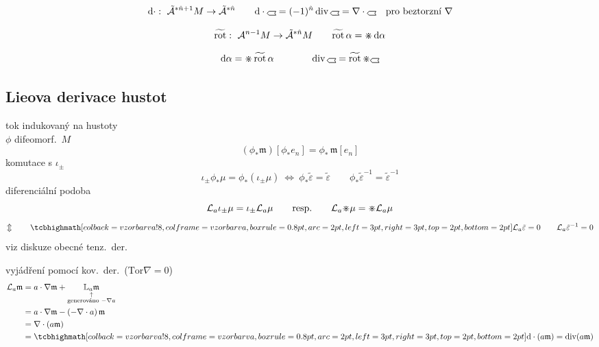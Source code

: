 \begin{definice}[]
\[
  \dd\cdot:\ \tilde{\mathcal{A}}^{*\hat n+1}M\to\tilde{\mathcal{A}}^{*\hat n} \qquad
  \dd\cdot\gmIhustsym = (-1)^{\hat n}\,\mathrm{div}\,\gmIhustsym = \nabla\cdot\gmIhustsym \quad\text{pro beztorzní } \nabla
\]
\end{definice}
\begin{definice}
\[
  \widetilde{\mathrm{rot}}:\ \mathcal{A}^{n-1}M\to\tilde{\mathcal{A}}^{*\hat n}M \qquad \widetilde{\mathrm{rot}}\,\alpha = \gmIhdual\,\dd\alpha
\]
\end{definice}
\begin{veta}[Lemma]
\[
  \dd\alpha = \gmIhdual\,\widetilde{\mathrm{rot}}\,\alpha \qquad\qquad \mathrm{div}\,\gmIhustsym = \widetilde{\mathrm{rot}}\,\gmIhdual\gmIhustsym
\]
\end{veta}

\subsection{Lieova derivace hustot}

tok indukovaný na hustoty \\
\quad $\phi$ difeomorf.\ $M$
\[
  (\phi_*\mathfrak{m})[\phi_*e_n] = \phi_*\,\mathfrak{m}[e_n]
\]
komutace s $\iota_\pm$
\[
  \iota_\pm\phi_*\mu = \phi_*(\iota_\pm\mu) \ \Longleftrightarrow\ \phi_*\tilde\varepsilon = \tilde\varepsilon \qquad \phi_*\tilde\varepsilon^{-1} = \tilde\varepsilon^{-1}
\]
diferenciální podoba
\[
  \mathcal{L}_a\iota_\pm\mu = \iota_\pm\mathcal{L}_a\mu \qquad\text{resp.}\qquad \mathcal{L}_a\mathord{\divideontimes}\mu = \mathord{\divideontimes}\mathcal{L}_a\mu
\]
\[
  \Updownarrow\qquad \vzorec{\mathcal{L}_a\tilde\varepsilon = 0} \qquad \mathcal{L}_a\tilde\varepsilon^{-1} = 0
\]
viz diskuze obecné tenz.\ der.

vyjádření pomocí kov.\ der.\ \quad ($\mathrm{Tor}\nabla = 0$)
\begin{align*}
  \mathcal{L}_a\mathfrak{m} &= a\cdot\nabla\mathfrak{m} + \underset{\substack{\uparrow\\\text{generováno } -\nabla a}}{\mathbb{L}_a\mathfrak{m}} \\
  &= a\cdot\nabla\mathfrak{m} - (-\nabla\cdot a)\,\mathfrak{m} \\
  &= \nabla\cdot(a\mathfrak{m}) \\
  &= \vzorec{\dd\cdot(a\mathfrak{m}) = \mathrm{div}(a\mathfrak{m})}
\end{align*}

